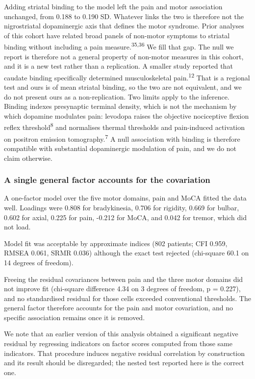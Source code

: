 \documentclass[
  english,
  12pt,
]{article}
\begin{document}
Adding striatal binding to the model left the pain and motor association unchanged, from 0.188 to 0.190 SD. Whatever links the two is therefore not the nigrostriatal dopaminergic axis that defines the motor syndrome. Prior analyses of this cohort have related broad panels of non-motor symptoms to striatal binding without including a pain measure.\textsuperscript{35,36} We fill that gap. The null we report is therefore not a general property of non-motor measures in this cohort, and it is a new test rather than a replication. A smaller study reported that caudate binding specifically determined musculoskeletal pain.\textsuperscript{12} That is a regional test and ours is of mean striatal binding, so the two are not equivalent, and we do not present ours as a non-replication. Two limits apply to the inference. Binding indexes presynaptic terminal density, which is not the mechanism by which dopamine modulates pain: levodopa raises the objective nociceptive flexion reflex threshold\textsuperscript{8} and normalises thermal thresholds and pain-induced activation on positron emission tomography.\textsuperscript{7} A null association with binding is therefore compatible with substantial dopaminergic modulation of pain, and we do not claim otherwise.

\subsubsection{A single general factor accounts for the covariation}\label{a-single-general-factor-accounts-for-the-covariation}

A one-factor model over the five motor domains, pain and MoCA fitted the data well. Loadings were 0.808 for bradykinesia, 0.706 for rigidity, 0.669 for bulbar, 0.602 for axial, 0.225 for pain, -0.212 for MoCA, and 0.042 for tremor, which did not load.

Model fit was acceptable by approximate indices (802 patients; CFI 0.959, RMSEA 0.061, SRMR 0.036) although the exact test rejected (chi-square 60.1 on 14 degrees of freedom).

Freeing the residual covariances between pain and the three motor domains did not improve fit (chi-square difference 4.34 on 3 degrees of freedom, p = 0.227), and no standardised residual for those cells exceeded conventional thresholds. The general factor therefore accounts for the pain and motor covariation, and no specific association remains once it is removed.

We note that an earlier version of this analysis obtained a significant negative residual by regressing indicators on factor scores computed from those same indicators. That procedure induces negative residual correlation by construction and its result should be disregarded; the nested test reported here is the correct one.
\end{document}
